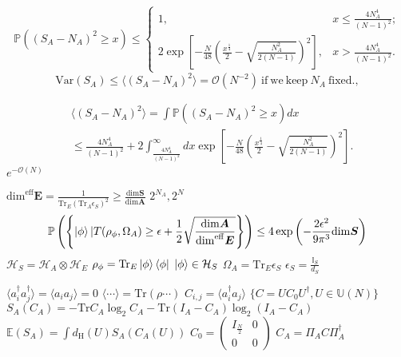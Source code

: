 \documentclass{beamer}
\begin{document}
\begin{frame}
   \[
\mathbb{P}((S_{A}-N_{A})^{2}\geq x)\leq\begin{cases}
1, & x\leq\frac{4N_{A}^{4}}{(N-1)^{2}};\\
2\exp\left[-\frac{N}{48}\left(\frac{x^{\frac{1}{4}}}{2}-\sqrt{\frac{N_{A}^{2}}{2(N-1)}}\right)^{2}\right], & x>\frac{4N_{A}^{4}}{(N-1)^{2}}.
\end{cases}
\]
\[
\mathrm{Var}(S_{A})\leq\langle(S_{A}-N_{A})^{2}\rangle=\mathcal{O}(N^{-2})\ \mathrm{if\ we\ keep}\ N_{A}\ \mathrm{fixed}.,
\]
\end{frame}
\begin{frame}
   \begin{align*}
&\langle(S_{A}-N_{A})^{2}\rangle =\int\mathbb{P}((S_{A}-N_{A})^{2}\geq x)dx\\
 & \leq\frac{4N_{A}^{4}}{(N-1)^{2}}+2\int_{\frac{4N_{A}^{4}}{(N-1)^{2}}}^{\infty}dx\exp\left[-\frac{N}{48}\left(\frac{x^{\frac{1}{4}}}{2}-\sqrt{\frac{N_{A}^{2}}{2(N-1)}}\right)^{2}\right].
\end{align*}
$e^{-\mathcal{O}(N)}$
\end{frame}
\begin{frame}
   $\mathrm{dim}^{\mathrm{eff}} \bm{E}=\frac{1}{\mathrm{Tr}_{E}(\mathrm{Tr}_{A}\epsilon_{S})^{2}}\geq\frac{\mathrm{dim} \bm{S}}{\mathrm{dim} \bm{A}}$
   $2^{N_A}, 2^N$
   \begin{equation*}
   \mathbb{P}\left(\left\{ \ket{\phi}|T(\rho_{\phi},\Omega_{A})\geq\epsilon+\frac{1}{2}\sqrt{\frac{\mathrm{dim} \bm{A}}{\mathrm{dim}^{\mathrm{eff}} \bm{E}}}\right\} \right)\leq4\exp{\left(-\frac{2\epsilon^2}{9\pi^{3}}\mathrm{dim} \bm{S}\right)}
   \end{equation*}
   $\mathcal{H}_S=\mathcal{H}_A\otimes\mathcal{H}_E$
   $\rho_{\phi}=\mathrm{Tr}_E\ket{\phi}\bra{\phi}$
   $\ket{\phi}\in\mathcal{H}_S$
   $\Omega_{A}=\mathrm{Tr}_E\epsilon_S$
   $\epsilon_S=\frac{\mathbb{I}_S}{d_S}$
\end{frame}
\begin{frame}
   $\langle a_{i}^{\dagger}a_{j}^{\dagger}\rangle=\langle a_{i}a_{j}\rangle=0$
    $\langle\cdots\rangle=\mathrm{Tr}(\rho\cdots)$
    $C_{i,j}=\langle a_i^\dag a_{j}\rangle$
    $\{C=UC_{0}U^{\dagger},U\in\mathbb{U}(N)\}$
    $S_{A}(C_{A})=-\mathrm{Tr} C_{A}\log_{2}C_{A}-\mathrm{Tr}(I_{A}-C_{A})\log_{2}(I_{A}-C_{A})$
    $\mathbb{E}(S_{A})=\int d_{\mathrm{H}}(U)S_{A}(C_{A}(U))$
$C_{0}=\begin{pmatrix}I_{\frac{N}{2}} & 0\\
0 & 0
\end{pmatrix}$
$C_{A}=\Pi_A C \Pi_A^{\dagger}$
\end{frame}
\end{document}
